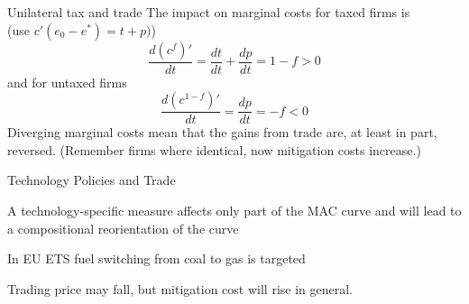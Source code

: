 
{Unilateral tax and trade}
The impact on marginal costs for taxed firms is \\
(use $c'(e_0-e^*) = t+p)$)
\[
\frac{d(c^f)'}{dt} = \frac{dt}{dt} + \frac{dp}{dt} = 1-f > 0
\]
and for untaxed firms
\[
\frac{d(c^{1-f})'}{dt} = \frac{dp}{dt} = -f < 0
\]
Diverging marginal costs mean that the gains from trade are, at least in part, reversed. (Remember firms where identical, now mitigation costs increase.)


{Technology Policies and Trade}


	A technology-specific measure affects only part of the MAC curve and will lead to a compositional reorientation of the curve

	In EU ETS fuel switching from coal to gas is targeted

	Trading price may fall, but mitigation cost will rise in general.

